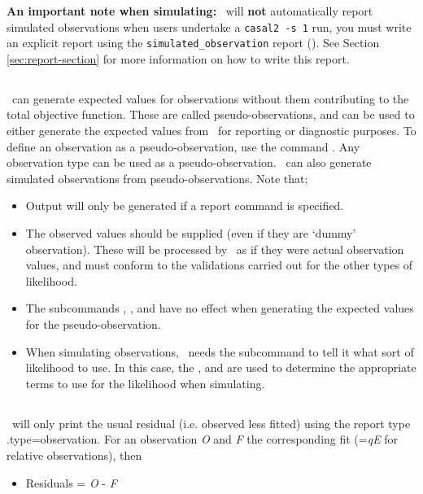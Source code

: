 {{{{\textbf{An important note when simulating:} \CNAME\ will \textbf{not} automatically report simulated observations when users undertake a \texttt{casal2 -s 1} run, you must write an explicit report using the \texttt{simulated\_observation} report (). See Section \ref{sec:report-section} for more information on how to write this report.


\subsection{}
\CNAME\ can generate expected values for observations without them contributing to the total objective function. These are called pseudo-observations, and can be used to either generate the expected values from \CNAME\ for reporting or diagnostic purposes. To define an observation as a pseudo-observation, use the command . Any observation type can be used as a pseudo-observation. \CNAME\ can also generate simulated observations from pseudo-observations. Note that;

\begin{itemize}
  \item Output will only be generated if a report command  is specified.
  \item The observed values should be supplied (even if they are `dummy' observation). These will be processed by \CNAME\ as if they were actual observation values, and must conform to the validations carried out for the other types of likelihood. 
  \item The subcommands , ,  and  have no effect when generating the expected values for the pseudo-observation.   
  \item When simulating observations, \CNAME\ needs the subcommand  to tell it what sort of likelihood to use. In this case, the ,  and  are used to determine the appropriate terms to use for the likelihood when simulating.
\end{itemize}

\subsection{}\label{sec:Residuals}}
\CNAME\ will only print the usual residual (i.e. observed less fitted) using the report type .type=observation. For an observation \textit{O} and \textit{F} the corresponding fit (=\textit{qE} for relative observations), then
\begin{itemize}
	\item Residuals = \textit{O} - \textit{F}
\end{itemize}

}}}
